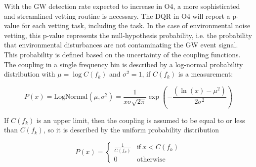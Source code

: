 With the \ac{GW} detection rate expected to increase in \ac{O4}, a more sophisticated and streamlined vetting routine is necessary.
The \ac{DQR} in \ac{O4} will report a p-value for each vetting task, including the  task.
In the case of environmental noise vetting, this p-value represents the null-hypothesis probability, i.e. the probability that environmental disturbances are not contaminating the \ac{GW} event signal.
This probability is defined based on the uncertainty of the coupling functions.
The coupling in a single frequency bin is described by a log-normal probability distribution with $\mu=\log{C(f_k)}$ and $\sigma^2=1$, if $C(f_k)$ is a measurement:

\begin{equation}
	P(x) = \mathrm{LogNormal}(\mu, \sigma^2) = \frac{1}{x \sigma \sqrt{2\pi}} \exp(-\frac{(\ln(x) - \mu^2)}{2 \sigma^2})
\end{equation}

If $C(f_k)$ is an upper limit, then the coupling is assumed to be equal to or less than $C(f_k)$, so it is described by the uniform probability distribution

\begin{equation}
	P(x) =
		\begin{cases}
      \frac{1}{C(f_k)} & \text{if}\ x < C(f_k)\\
      0 & \text{otherwise}
    \end{cases}
\end{equation}
